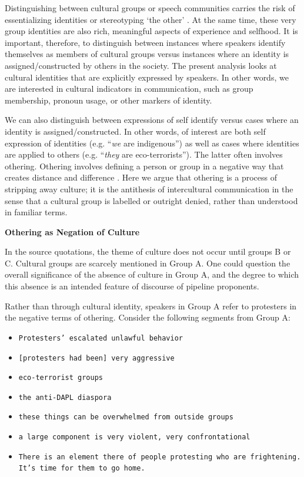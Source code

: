 Distinguishing between cultural groups or speech communities carries the risk of essentializing identities \citep{Dervin2016a, Piller2007a} or stereotyping `the other' \citep{Fedor2014a}. At the same time, these very group identities are also rich, meaningful aspects of experience and selfhood. It is important, therefore, to distinguish between instances where speakers identify themselves as members of cultural groups versus instances where an identity is assigned/constructed by others in the society. The present analysis looks at cultural identities that are explicitly expressed by speakers. In other words, we are interested in cultural indicators in communication, such as group membership, pronoun usage, or other markers of identity. 

We can also distinguish between expressions of self identify versus cases where an identity is assigned/constructed. In other words, of interest are both self expression of identities (e.g. ``\textit{we} are indigenous'') as well as cases where identities are applied to others (e.g. ``\textit{they} are eco-terrorists''). The latter often involves othering. Othering involves defining a person or group in a negative way that creates distance and difference \citep{Powell2017}. Here we argue that othering is a process of stripping away culture; it is the antithesis of intercultural communication in the sense that a cultural group is labelled or outright denied, rather than understood in familiar terms.  

\textbf{Othering as Negation of Culture}

In the source quotations, the theme of culture does not occur until groups B or C. Cultural groups are scarcely mentioned in Group A. One could question the overall significance of the absence of culture in Group A, and the degree to which this absence is an intended feature of discourse of pipeline proponents. 

Rather than through cultural identity, speakers in Group A refer to protesters in the negative terms of othering. Consider the following segments from Group A:

\begin{footnotesize}
\begin{itemize}
\item[-] \texttt{Protesters' escalated unlawful behavior}
\item[-] \texttt{[protesters had been] very aggressive}
\item[-] \texttt{eco-terrorist groups}
\item[-] \texttt{the anti-DAPL diaspora}
\item[-] \texttt{these things can be overwhelmed from outside groups}
\item[-] \texttt{a large component is very violent, very confrontational}
\item[-] \texttt{There is an element there of people protesting who are frightening. It's time for them to go home.}
\end{itemize}
\end{footnotesize}

